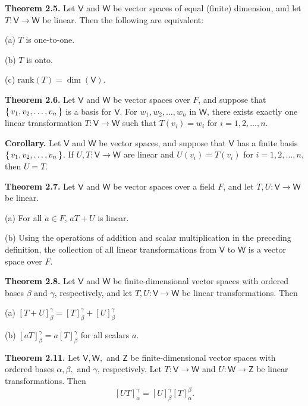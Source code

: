 \documentclass{article}
\newcommand{\0}{\mathit{0}}
\begin{document}
\medskip

\textbf{Theorem 2.5.} Let $\mathsf{V}$ and $\mathsf{W}$ be vector spaces of equal (finite)
dimension, and let $T: \mathsf{V} \to \mathsf{W}$ be linear. Then the following are equivalent:

(a) $T$ is one-to-one.

(b) $T$ is onto.

(c) $\mathrm{rank}(T) = \dim(\mathsf{V})$.

\medskip

\textbf{Theorem 2.6.} Let $\mathsf{V}$ and $\mathsf{W}$ be vector spaces over $F$, and suppose that
$\set{v_1, v_2, \dots, v_n}$ is a basis for $\mathsf{V}$.
For $w_1, w_2, \dots, w_n$ in $\mathsf{W}$, there exists exactly one linear transformation
$T: \mathsf{V} \to \mathsf{W}$ such that $T(v_i) = w_i$ for $i = 1, 2, \dots, n$.

\medskip

\textbf{Corollary.} Let $\mathsf{V}$ and $\mathsf{W}$ be vector spaces, and suppose that
$\mathsf{V}$ has a finite basis $\set{v_1, v_2, \dots, v_n}$.
If $U, T: \mathsf{V} \to \mathsf{W}$ are linear and $U(v_i) = T(v_i)$ for
$i = 1, 2, \dots, n$, then $U = T$.

\medskip

\textbf{Theorem 2.7.} Let $\mathsf{V}$ and $\mathsf{W}$ be vector spaces over a field $F$,
and let $T, U: \mathsf{V} \to \mathsf{W}$ be linear.

(a) For all $a \in F$, $aT + U$ is linear.

(b) Using the operations of addition and scalar multiplication in the preceding
definition, the collection of all linear transformations from $\mathsf{V}$ to
$\mathsf{W}$ is a vector space over $F$.

\medskip

\textbf{Theorem 2.8.} Let $\mathsf{V}$ and $\mathsf{W}$ be finite-dimensional vector spaces
with ordered bases $\beta$ and $\gamma$, respectively, and let $T, U: \mathsf{V} \to \mathsf{W}$
be linear transformations. Then

(a) $\left[ T + U \right]^\gamma_\beta = \left[ T \right]^\gamma_\beta + \left[ U \right]^\gamma_\beta$

(b) $\left[ aT \right]^\gamma_\beta = a \left[ T \right]^\gamma_\beta$ for all scalars $a$.

\medskip

\textbf{Theorem 2.11.} Let $\mathsf{V}, \mathsf{W},$ and $\mathsf{Z}$ be finite-dimensional vector spaces 
with ordered bases $\alpha, \beta,$ and $\gamma$, respectively. Let 
$T: \mathsf{V} \to \mathsf{W}$ and $U: \mathsf{W} \to \mathsf{Z}$ be linear transformations. 
Then
\[
\left[ UT \right]^\gamma_\alpha = \left[ U \right]^\gamma_\beta \left[ T \right]^\beta_\alpha.
\]
\end{document}
